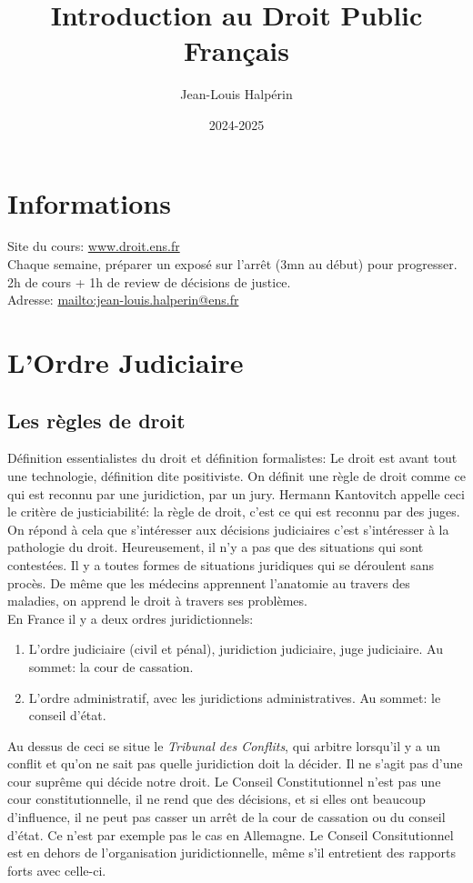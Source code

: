 \documentclass[math]{cours}
\author{Jean-Louis Halpérin}
\title{Introduction au Droit Public Français}
\date{2024-2025}
\begin{document}
\bettertitle

\section*{Informations}
Site du cours: \url{www.droit.ens.fr}\\
Chaque semaine, préparer un exposé sur l'arrêt (3mn au début) pour progresser. 2h de cours + 1h de review de décisions de justice.\\
Adresse: \url{mailto:jean-louis.halperin@ens.fr}

\section{L'Ordre Judiciaire}
\subsection{Les règles de droit}
	Définition essentialistes du droit et définition formalistes: Le droit est avant tout une technologie, définition dite positiviste.
	On définit une règle de droit comme ce qui est reconnu par une juridiction, par un jury.
	Hermann Kantovitch appelle ceci le critère de justiciabilité: la règle de droit, c'est ce qui est reconnu par des juges.
	On répond à cela que s'intéresser aux décisions judiciaires c'est s'intéresser à la pathologie du droit.
	Heureusement, il n'y a pas que des situations qui sont contestées.
	Il y a toutes formes de situations juridiques qui se déroulent sans procès.
	De même que les médecins apprennent l'anatomie au travers des maladies, on apprend le droit à travers ses problèmes. \\

	En France il y a deux ordres juridictionnels:
	\begin{enumerate}
		\item L'ordre judiciaire (civil et pénal), juridiction judiciaire, juge judiciaire. Au sommet: la cour de cassation.
		\item L'ordre administratif, avec les juridictions administratives. Au sommet: le conseil d'état.
	\end{enumerate}
	Au dessus de ceci se situe le \emph{Tribunal des Conflits}, qui arbitre lorsqu'il y a un conflit et qu'on ne sait pas quelle juridiction doit la décider.
	Il ne s'agit pas d'une cour suprême qui décide notre droit.
	Le Conseil Constitutionnel n'est pas une cour constitutionnelle, il ne rend que des décisions, et si elles ont beaucoup d'influence, il ne peut pas casser un arrêt de la cour de cassation ou du conseil d'état.
	Ce n'est par exemple pas le cas en Allemagne.
	Le Conseil Consitutionnel est en dehors de l'organisation juridictionnelle, même s'il entretient des rapports forts avec celle-ci.
\end{document}
